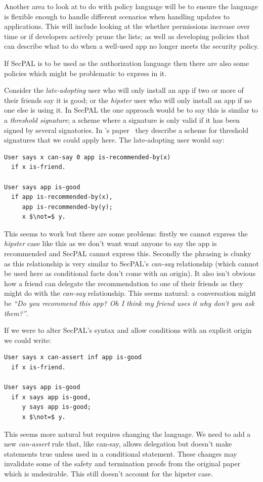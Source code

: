 \documentclass[a4paper]{article}
\begin{document}
Another area to look at to do with policy language will be to ensure the language
is flexible enough to handle different scenarios when handling updates to
applications.  This will include looking at the whether permissions increase
over time or if developers actively prune the lists; as well as developing
policies that can describe what to do when a well-used app no longer meets the
security policy.  

\label{secpal:problems}
If SecPAL is to be used as the authorization language then there are also some
policies which might be problematic to express in it.

Consider the \emph{late-adopting} user who will only install an app if
two or more of their friends say it is good; or the \emph{hipster} user who will
only install an app if no one else is using it. In SecPAL the one approach would
be to say this is similar to a \emph{threshold signature}; a scheme where a
signature is only valid if it has been signed by several signatories.  In
\citeauthor*{Becker:2006vh}'s paper~\cite{Becker:2006vh} they describe a scheme
for threshold signatures that we could apply here.  The late-adopting user would
say:
\begin{lstlisting}[language=SecPAL, mathescape=true]
User says x can-say 0 app is-recommended-by(x)
  if x is-friend.

User says app is-good
  if app is-recommended-by(x),
     app is-recommended-by(y);
     x $\not=$ y.
\end{lstlisting}
This seems to work but there are some problems: firstly we cannot express the
\emph{hipster} case like this as we don't want want anyone to say the app is
recommended and SecPAL cannot express this.  Secondly the phrasing is clunky as
this relationship is very similar to SecPAL's \emph{can-say} relationship (which
cannot be used here as conditional facts don't come with an origin).  It also
isn't obvious how a friend can delegate the recommendation to one of their
friends as they might do with the \emph{can-say} relationship. This seems
natural: a conversation might be \emph{``Do you recommend this app? Oh I think
my friend uses it why don't you ask them?''}.  

If we were to alter SecPAL's syntax and allow conditions with an explicit origin
we could write:
\begin{lstlisting}[language=SecPAL, mathescape=true]
User says x can-assert inf app is-good
  if x is-friend.

User says app is-good
  if x says app is-good,
     y says app is-good;
     x $\not=$ y.
\end{lstlisting}
This seems more natural but requires changing the language. We need to add a new
\emph{can-assert} rule that, like can-say, allows delegation but doesn't make
statements true unless used in a conditional statement.  These changes may
invalidate some of the safety and termination proofs from the original
paper~\cite{Becker:2006vh} which is undesirable.  This still doesn't account for
the hipster case. 
\end{document}
